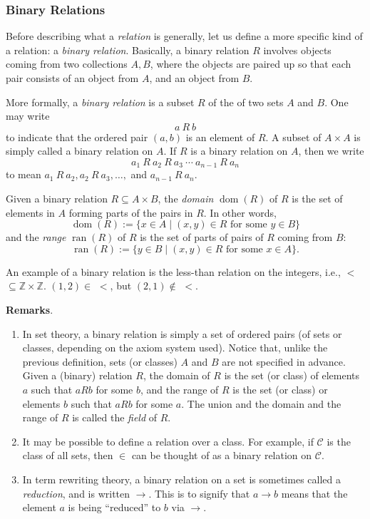 \documentclass[12pt]{article}
\def\Z{\mathbb{Z}}
\begin{document}

\subsubsection*{Binary Relations}

Before describing what a \emph{relation} is generally, let us define a more specific kind of a relation: a \emph{binary relation}.  Basically, a binary relation $R$ involves objects coming from two collections $A,B$, where the objects are paired up so that each pair consists of an object from $A$, and an object from $B$.  

More formally, a \emph{binary relation} is a subset $R$ of the  of two sets $A$ and $B$.  One may write $$a\: R\: b$$ to indicate that the ordered pair $(a, b)$ is an element of $R$.  A subset of $A\times A$ is simply called a binary relation on $A$.  If $R$ is a binary relation on $A$, then we write $$a_1 \: R \: a_2 \: R \: a_3 \: \cdots \: a_{n-1} \: R \: a_n $$ to mean $a_1 \: R\: a_2, a_2\: R\: a_3, \ldots,$ and $a_{n-1}\: R \: a_n$.

Given a binary relation $R\subseteq A\times B$, the \emph{domain} $\operatorname{dom}(R)$ of $R$ is the set of elements in $A$ forming parts of the pairs in $R$.  In other words, $$\operatorname{dom}(R):=\lbrace x\in A\mid (x,y)\in R \mbox{ for some }y \in B \rbrace$$ and the \emph{range} $\operatorname{ran}(R)$ of $R$ is the set of parts of pairs of $R$ coming from $B$: $$\operatorname{ran}(R):=\lbrace y\in B\mid (x,y)\in R \mbox{ for some }x\in A \rbrace.$$

An example of a binary relation is the less-than relation on the integers, i.e.,
$<$ $\subseteq\Z\times\Z$.  $(1, 2) \in$ $<$, but $(2, 1) \notin$ $<$.

\textbf{Remarks}.  
\begin{enumerate}
\item
In set theory, a binary relation is simply a set of ordered pairs (of sets or classes, depending on the axiom system used).  Notice that, unlike the previous definition, sets (or classes) $A$ and $B$ are not specified in advance.  Given a (binary) relation $R$, the domain of $R$ is the set (or class) of elements $a$ such that $a R b$ for some $b$, and the range of $R$ is the set (or class) or elements $b$ such that $a R b$ for some $a$.  The union and the domain and the range of $R$ is called the \emph{field} of $R$.
\item
It may be possible to define a relation over a class.  For example, if $\mathcal{C}$ is the class of all sets, then $\in$ can be thought of as a binary relation on $\mathcal{C}$.
\item
In term rewriting theory, a binary relation on a set is sometimes called a \emph{reduction}, and is written $\to$.  This is to signify that $a\to b$ means that the element $a$ is being ``reduced'' to $b$ via $\to$.
\end{enumerate}
\end{document}
